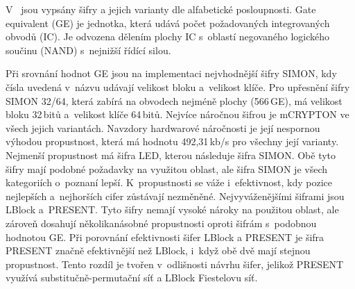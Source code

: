 V~ jsou vypsány šifry a jejich varianty dle alfabetické posloupnosti. Gate equivalent (GE) je jednotka, která udává počet požadovaných integrovaných obvodů (IC). Je odvozena dělením plochy IC s~oblastí negovaného logického součinu (NAND) s~nejnižší řídící silou. 

Při srovnání hodnot GE jsou na implementaci nejvhodnější šifry SIMON, kdy čísla uvedená v~názvu udávají velikost bloku a~velikost klíče. Pro upřesnění šifry SIMON 32/64, která zabírá na obvodech nejméně plochy (566\,GE), má velikost bloku 32\,bitů a~velikost klíče 64\,bitů. Nejvíce náročnou šifrou je mCRYPTON ve všech jejich variantách. Navzdory hardwarové náročnosti je její nespornou výhodou propustnost, která má hodnotu 492,31\,kb/s pro všechny její varianty. Nejmenší propustnost má šifra LED, kterou následuje šifra SIMON. Obě tyto šifry mají podobné požadavky na využitou oblast, ale šifra SIMON je všech kategoriích o~poznaní lepší. K~propustnosti se váže i~efektivnost, kdy pozice nejlepších a~nejhorších cifer zůstávají nezměněné. Nejvyváženějšími šiframi jsou LBlock a~PRESENT. Tyto šifry nemají vysoké nároky na použitou oblast, ale zároveň dosahují několikanásobné propustnosti oproti šifrám s~podobnou hodnotou GE. Při porovnání efektivnosti šifer LBlock a PRESENT je šifra PRESENT značně efektivnější než LBlock, i~když obě dvě mají stejnou propustnost. Tento rozdíl je tvořen v~odlišnosti návrhu šifer, jelikož PRESENT využívá substitučně-permutační síť a LBlock Fiestelovu síť.


